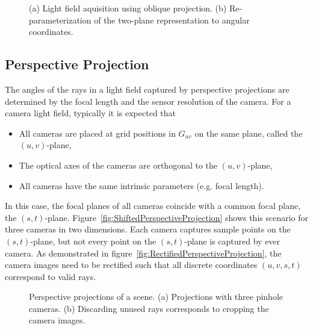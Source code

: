 \begin{figure}[tb]
	\subfigure[]{
		\centering
		
		\label{fig:ObliqueProjection}
	}
	\hfill
	\subfigure[]{
		\centering
		
		\label{fig:ObliqueProjectionReparameterization}
	}
	\caption{(a) Light field aquisition using oblique projection. (b) Re-parameterization of the two-plane representation to angular coordinates.}
\end{figure}

\subsection*{Perspective Projection}
% 
The angles of the rays in a light field captured by perspective projections are determined by the focal length and the sensor resolution of the camera.
For a camera light field, typically it is expected that
\begin{itemize}
	\item All cameras are placed at grid positions in $G_{uv}$ on the same plane, called the $(u, v)$-plane, 
	\item The optical axes of the cameras are orthogonal to the $(u, v)$-plane, 
	\item All cameras have the same intrinsic parameters (e.g. focal length).
\end{itemize}
In this case, the focal planes of all cameras coincide with a common focal plane, the $(s, t)$-plane.
Figure~\ref{fig:ShiftedPerspectiveProjection} shows this scenario for three cameras in two dimensions.
Each camera captures sample points on the $(s, t)$-plane, but not every point on the $(s, t)$-plane is captured by ever camera.
As demonstrated in figure~\ref*{fig:RectifiedPerspectiveProjection}, the camera images need to be rectified such that all discrete coordinates $(u, v, s, t)$ correspond to valid rays.



\begin{figure}[tb]
	\subfigure[]{
		\centering
		
		\label{fig:ShiftedPerspectiveProjection}
	}
	\hfill
	\subfigure[]{
		\centering
		
		\label{fig:RectifiedPerspectiveProjection}
	}
	\caption{Perspective projections of a scene. 
			 (a) Projections with three pinhole cameras. 
			 (b) Discarding unused rays corresponds to cropping the camera images.}
\end{figure}


